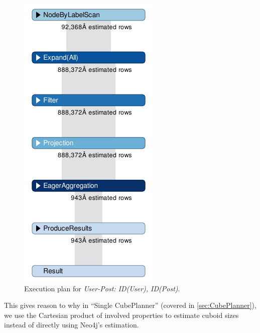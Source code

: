 \begin{figure}
	\centering
	\includegraphics[scale=0.7]{pic/wrong2}
	\caption{Execution plan for \textit{User-Post: ID(User), ID(Post)}.}
	\label{fig:wrong2}
\end{figure} 

This gives reason to why in ``Single CubePlanner'' (covered in \ref{sec:CubePlanner}), we use the Cartesian product of involved properties to estimate cuboid sizes instead of directly using Neo4j's estimation.
